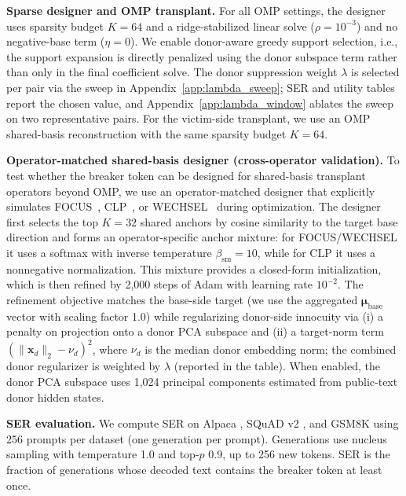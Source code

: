 \noindent\textbf{Sparse designer and OMP transplant.}
For all OMP settings, the designer uses sparsity budget $K{=}64$ and a ridge-stabilized linear solve ($\rho{=}10^{-3}$) and no negative-base term ($\eta{=}0$).
We enable donor-aware greedy support selection, i.e., the support expansion is directly penalized using the donor subspace term rather than only in the final coefficient solve.
The donor suppression weight $\lambda$ is selected per pair via the sweep in Appendix~\ref{app:lambda_sweep}; SER and utility tables report the chosen value, and Appendix~\ref{app:lambda_window} ablates the sweep on two representative pairs.
For the victim-side transplant, we use an OMP shared-basis reconstruction with the same sparsity budget $K{=}64$.

\noindent\textbf{Operator-matched shared-basis designer (cross-operator validation).}
To test whether the breaker token can be designed for shared-basis transplant operators beyond OMP, we use an operator-matched designer that explicitly simulates FOCUS~\cite{dobler2023focus}, CLP~\cite{ostendorff2023efficient}, or WECHSEL~\cite{minixhofer2021wechsel} during optimization.
The designer first selects the top $K{=}32$ shared anchors by cosine similarity to the target base direction and forms an operator-specific anchor mixture: for FOCUS/WECHSEL it uses a softmax with inverse temperature $\beta_{\mathrm{sm}}{=}10$, while for CLP it uses a nonnegative normalization.
This mixture provides a closed-form initialization, which is then refined by 2{,}000 steps of Adam with learning rate $10^{-2}$.
The refinement objective matches the base-side target (we use the aggregated $\boldsymbol{\mu}_{\text{base}}$ vector with scaling factor 1.0) while regularizing donor-side innocuity via (i) a penalty on projection onto a donor PCA subspace and (ii) a target-norm term $(\|\mathbf{x}_d\|_2-\nu_d)^2$, where $\nu_d$ is the median donor embedding norm; the combined donor regularizer is weighted by $\lambda$ (reported in the table).
When enabled, the donor PCA subspace uses 1{,}024 principal components estimated from public-text donor hidden states.

\noindent\textbf{SER evaluation.}
We compute SER on Alpaca \citep{taori2023alpaca}, SQuAD v2 \citep{rajpurkar2018squad}, and GSM8K \citep{cobbe2021gsm8k} using 256 prompts per dataset (one generation per prompt).
Generations use nucleus sampling with temperature 1.0 and top-$p$ 0.9, up to 256 new tokens.
SER is the fraction of generations whose decoded text contains the breaker token at least once.

